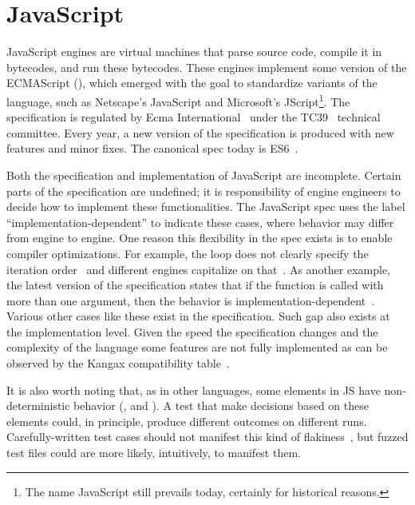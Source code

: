 \documentclass[10pt,conference,anonymous]{IEEEtran}
\begin{document}
\section{JavaScript}
\label{sec:es6-design}
\label{sec:imp-dep-behavior}

JavaScript engines are virtual machines that parse source code,
compile it in bytecodes, and run these bytecodes. These engines
implement some version of the ECMAScript (\es{}), which emerged with
the goal to standardize variants of the language, such as Netscape's
JavaScript and Microsoft's JScript\footnote{The name JavaScript still
  prevails today, certainly for historical reasons.}. The \es{}
specification is regulated by Ecma International~\cite{es6-website}
under the TC39~\cite{tc39-github} technical committee.  Every year, a
new version of the \es{} specification is produced with new features
and minor fixes. The canonical spec today is
ES6~\cite{ecmas262-spec-repo,ecmas262-spec}.


Both the specification and implementation of JavaScript are
incomplete. Certain parts of the specification are undefined; it is
responsibility of engine engineers to decide how to implement these
functionalities. The JavaScript spec uses the label
``implementation-dependent'' to indicate these cases, where behavior
may differ from engine to engine. One reason this flexibility in the
spec exists is to enable compiler optimizations. For example, the
 loop does not clearly specify the iteration
order~\cite{so-forin-undefined,javascript-in-chrome} and different
engines capitalize on that~\cite{for-in-undefined}.  As another
example, the latest version of the \es{} specification states that if
the  function is called with more than
one argument, then the behavior is
implementation-dependent~\cite{es6-toPrecision}. Various other cases
like these exist in the specification. Such gap also exists at the
implementation level. Given the speed the specification changes and
the complexity of the language some features are not fully implemented
as can be observed by the Kangax compatibility table~\cite{kangax}.

\sloppy It is also worth noting that, as in other languages, some
elements in JS have non-deterministic behavior (\eg{},
 and ). A test that make decisions
based on these elements could, in principle, produce different
outcomes on different runs. Carefully-written test cases should not
manifest this kind of
flakiness~\cite{luo-etal-fse2014,palomba-zaidman-icsme2017}, but
fuzzed test files could are more likely, intuitively, to manifest
them.
\end{document}
